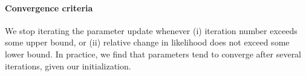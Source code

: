 \paragraph{Convergence criteria}

We stop iterating the parameter update whenever (i) iteration number exceeds some upper bound, or (ii) relative change in likelihood does not exceed some lower bound.  In practice, we find that parameters tend to converge after several iterations, given our initialization.  %
% 

